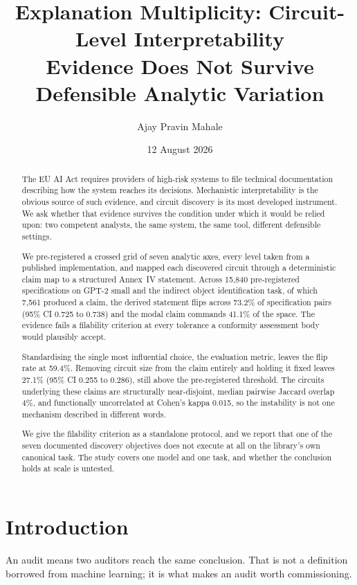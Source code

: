 \documentclass[11pt]{article}
\title{\bfseries Explanation Multiplicity: Circuit-Level Interpretability\\
Evidence Does Not Survive Defensible Analytic Variation}
\author{Ajay Pravin Mahale}
\date{12 August 2026}
\begin{document}
\maketitle

\begin{abstract}
\noindent
The EU AI Act requires providers of high-risk systems to file technical
documentation describing how the system reaches its decisions. Mechanistic
interpretability is the obvious source of such evidence, and circuit discovery is
its most developed instrument. We ask whether that evidence survives the condition
under which it would be relied upon: two competent analysts, the same system, the
same tool, different defensible settings.

We pre-registered a crossed grid of seven analytic axes, every level taken from a
published implementation, and mapped each discovered circuit through a
deterministic claim map to a structured Annex~IV statement. Across 15{,}840
pre-registered specifications on GPT-2 small and the indirect object
identification task, of which 7{,}561 produced a claim, the derived statement
flips across 73.2\% of specification pairs (95\% CI 0.725 to 0.738) and the modal
claim commands 41.1\% of the space. The evidence fails a filability criterion at
every tolerance a conformity assessment body would plausibly accept.

Standardising the single most influential choice, the evaluation metric, leaves
the flip rate at 59.4\%. Removing circuit size from the claim entirely and holding
it fixed leaves 27.1\% (95\% CI 0.255 to 0.286), still above the pre-registered
threshold. The circuits underlying these claims are structurally near-disjoint,
median pairwise Jaccard overlap 4\%, and functionally uncorrelated at Cohen's
kappa 0.015, so the instability is not one mechanism described in different words.

We give the filability criterion as a standalone protocol, and we report that one
of the seven documented discovery objectives does not execute at all on the
library's own canonical task. The study covers one model and one task, and whether
the conclusion holds at scale is untested.
\end{abstract}

\section{Introduction}

An audit means two auditors reach the same conclusion. That is not a definition
borrowed from machine learning; it is what makes an audit worth commissioning.
\end{document}
